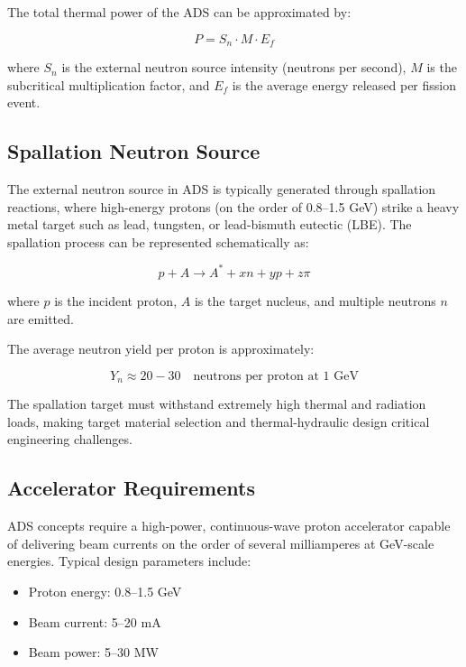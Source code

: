 The total thermal power of the ADS can be approximated by:

\begin{equation}
P = S_n \cdot M \cdot E_f
\end{equation}

where $S_n$ is the external neutron source intensity (neutrons per second), $M$ is the subcritical multiplication factor, 
and $E_f$ is the average energy released per fission event.

\subsection{Spallation Neutron Source}

The external neutron source in ADS is typically generated through spallation reactions, where high-energy protons 
(on the order of 0.8--1.5 GeV) strike a heavy metal target such as lead, tungsten, or lead-bismuth eutectic (LBE). 
The spallation process can be represented schematically as:

\begin{equation}
p + A \rightarrow A^* + x n + y p + z \pi
\end{equation}

where $p$ is the incident proton, $A$ is the target nucleus, and multiple neutrons $n$ are emitted.

The average neutron yield per proton is approximately:

\begin{equation}
Y_n \approx 20 - 30 \quad \text{neutrons per proton at } 1 \text{ GeV}
\end{equation}

The spallation target must withstand extremely high thermal and radiation loads, making target material selection and 
thermal-hydraulic design critical engineering challenges.

\subsection{Accelerator Requirements}

ADS concepts require a high-power, continuous-wave proton accelerator capable of delivering beam currents on the order of 
several milliamperes at GeV-scale energies. Typical design parameters include:

\begin{itemize}
\item Proton energy: 0.8--1.5 GeV
\item Beam current: 5--20 mA
\item Beam power: 5--30 MW
\end{itemize}

